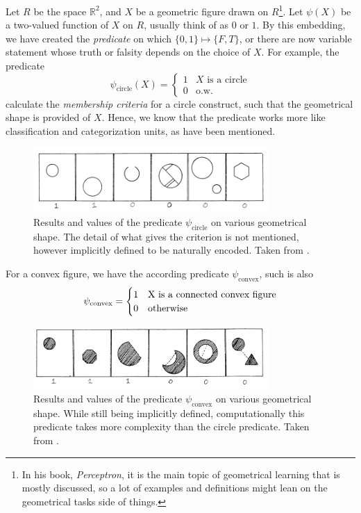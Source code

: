 Let $R$ be the space $\mathbb{R}^{2}$, and $X$ be a geometric figure drawn on $R$\footnote{In his book, \textit{Perceptron}, it is the main topic of geometrical learning that is mostly discussed, so a lot of examples and definitions might lean on the geometrical tasks side of things.}. Let $\psi(X)$ be a two-valued function of $X$ on $R$, usually think of as $0$ or $1$. By this embedding, we have created the \textit{predicate} on which $\{0,1\}\mapsto \{F,T\}$, or there are now variable statement whose truth or falsity depends on the choice of $X$. For example, the predicate
\begin{equation*}
    \psi_{\text{circle}} (X) = \begin{cases}
        1 & X \text{ is a circle}\\
        0 & \text{o.w.}
    \end{cases}
\end{equation*} 
calculate the \textit{membership criteria} for a circle construct, such that the geometrical shape is provided of $X$. Hence, we know that the predicate works more like classification and categorization units, as have been mentioned. 

\begin{figure}[htb]
    \centering
    \includegraphics[width=0.8\textwidth]{img/minsky_perceptron_predicate_1.png}
    \caption{Results and values of the predicate $\psi_{\text{circle}}$ on various geometrical shape. The detail of what gives the criterion is not mentioned, however implicitly defined to be naturally encoded. Taken from \cite{10.5555/50066}.}
\end{figure}

For a convex figure, we have the according predicate $\psi_{\text{convex}}$, such is also 
\begin{equation}
    \psi_{\text{convex}} = \begin{cases}
        1 & $X$ \text{ is a connected convex figure}\\
        0 & \text{otherwise}
    \end{cases}
\end{equation}
\begin{figure}[htb]
    \centering
    \includegraphics[width=0.8\textwidth]{img/minsky_perceptron_predicate_2.png}
    \caption{Results and values of the predicate $\psi_{\text{convex}}$ on various geometrical shape. While still being implicitly defined, computationally this predicate takes more complexity than the circle predicate. Taken from \cite{10.5555/50066}.}
\end{figure}

